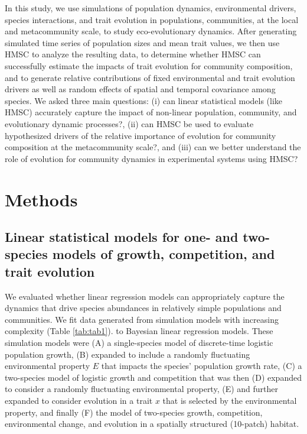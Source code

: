 \documentclass[
]{article}
\begin{document}
In this study, we use simulations of population dynamics, environmental drivers, species interactions, and trait evolution in populations, communities, at the local and metacommunity scale, to study eco-evolutionary dynamics. After generating simulated time series of population sizes and mean trait values, we then use HMSC to analyze the resulting data, to determine whether HMSC can successfully estimate the impacts of trait evolution for community composition, and to generate relative contributions of fixed environmental and trait evolution drivers as well as random effects of spatial and temporal covariance among species. We asked three main questions: (i) can linear statistical models (like HMSC) accurately capture the impact of non-linear population, community, and evolutionary dynamic processes?, (ii) can HMSC be used to evaluate hypothesized drivers of the relative importance of evolution for community composition at the metacommunity scale?, and (iii) can we better understand the role of evolution for community dynamics in experimental systems using HMSC?

\hypertarget{methods}{%
\section{Methods}\label{methods}}

\hypertarget{linear-statistical-models-for-one--and-two-species-models-of-growth-competition-and-trait-evolution}{%
\subsection{Linear statistical models for one- and two-species models of growth, competition, and trait evolution}\label{linear-statistical-models-for-one--and-two-species-models-of-growth-competition-and-trait-evolution}}

We evaluated whether linear regression models can appropriately capture the dynamics that drive species abundances in relatively simple populations and communities. We fit data generated from simulation models with increasing complexity (Table \ref{tab:tab1}). to Bayesian linear regression models. These simulation models were (A) a single-species model of discrete-time logistic population growth, (B) expanded to include a randomly fluctuating environmental property \(E\) that impacts the species' population growth rate, (C) a two-species model of logistic growth and competition that was then (D) expanded to consider a randomly fluctuating environmental property, (E) and further expanded to consider evolution in a trait \(x\) that is selected by the environmental property, and finally (F) the model of two-species growth, competition, environmental change, and evolution in a spatially structured (10-patch) habitat.
\end{document}
